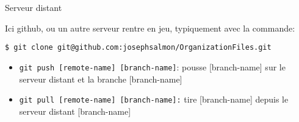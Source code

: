 \documentclass[unknownkeysallowed]{beamer}
\begin{document}
\begin{frame}[fragile]{Serveur distant}

Ici github, ou un autre serveur rentre en jeu, typiquement avec la commande:

\vspace{0.5cm}
\begin{lstlisting}
$ git clone git@github.com:josephsalmon/OrganizationFiles.git
\end{lstlisting}

\vspace{0.5cm}


\begin{itemize}
  \item
\lstinline[basicstyle =\ttfamily]+git push [remote-name] [branch-name]+: pousse [branch-name] sur le serveur distant et la branche [branch-name]

\vspace{0.39cm}

  \item
\lstinline[basicstyle =\ttfamily]+git pull [remote-name] [branch-name]:+ tire [branch-name] depuis le serveur distant [branch-name]

\end{itemize}

\end{frame}


\end{document}
